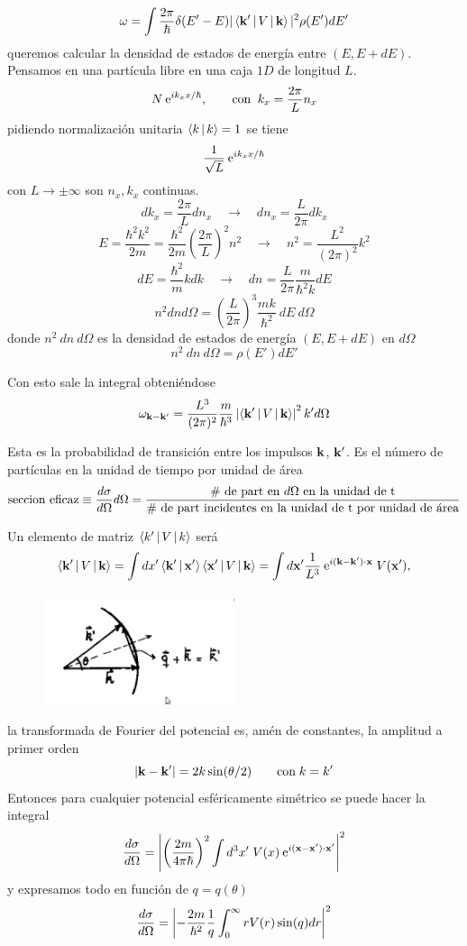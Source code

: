 \documentclass[10pt,oneside]{CBFT_book}
\begin{document}
\[
	\omega = \int \frac{2\pi}{\hbar}  \delta(E'-E) |\Braket{\vb{k}'|V|\vb{k}}|^2 \rho(E') dE'
\]
queremos calcular la densidad de estados de energía entre $(E,E+dE)$. Pensamos en una partícula libre en una 
caja $1D$ de longitud $L$.
\[
	N \:\mathrm{e}^{i k_x x /\hbar}, \qquad \text{con} \;\; k_x = \frac{2\pi}{L}n_x
\]
pidiendo normalización unitaria $\Braket{k|k}=1$ se tiene 
\[
	\frac{1}{\sqrt{L}} \:\mathrm{e}^{i k_x x /\hbar}
\]
con $L\to\pm\infty$ son $n_x,k_x$ continuas.
\[
	dk_x = \frac{2\pi}{L} dn_x \quad \longrightarrow \quad  dn_x = \frac{L}{2\pi} dk_x 
\]
\[
	E = \frac{\hbar^2k^2}{2m} = \frac{\hbar^2}{2m} \left( \frac{2\pi}{L}\right)^2 n^2 \quad 
	\longrightarrow \quad n^2 = \frac{L^2}{(2\pi)^2}k^2
\]
\[
	dE = \frac{\hbar^2}{m} k dk \quad \longrightarrow \quad dn = \frac{L}{2\pi}\frac{m}{\hbar^2 k} dE
\]
\[
	n^2 dn d\Omega = \left( \frac{L}{2\pi} \right)^3 \frac{mk}{\hbar^2} \:dE \:d\Omega
\]
donde $n^2\:dn\:d\Omega$ es la densidad de estados de energía $(E,E+dE)$ en $d\Omega$
\[
	n^2 \: dn \: d\Omega = \rho(E') dE'
\]

Con esto sale la integral obteniéndose
\[
	\omega_{\vb{k}-\vb{k}'} = 
	\frac{L^3}{(2\pi)^2} \frac{m}{\hbar^3} \left|\Braket{\vb{k}'|V|\vb{k}}\right|^2 k'd\Omega
\]

Esta es la probabilidad de transición entre los impulsos $\vb{k}$, $\vb{k}'$. Es el número de partículas en 
la unidad de tiempo por unidad de área 
\[
	\text{seccion eficaz} \equiv \frac{d^{\hspace{-0.05em}} {\sigma}}{d {\Omega}^{\hspace{-0.05em}}}d\Omega =
	\frac{\text{\# de part en $d\Omega$ en la unidad de t}}
	{\text{\# de part incidentes en la unidad de t por unidad de área}}
\]

Un elemento de matriz $\Braket{k'|V|k}$ será 
\[
	\Braket{\vb{k}'|V|\vb{k}} = \int dx'\Braket{\vb{k}'|\vb{x}'} \Braket{\vb{x}'|V|\vb{k}} =
	\int d\vb{x}' \frac{1}{L^3} \euler^{i (\vb{k}-\vb{k}')\cdot \vb{x}} \; V(\vb{x}'),
\]
\begin{figure}[htb]
	\begin{center}
	\includegraphics[width=0.5\textwidth]{images/teo2_31.pdf}
	\end{center}
	\caption{}
\end{figure} 
la transformada de Fourier del potencial es, amén de constantes, la amplitud a primer orden 
\[
	|\vb{k} - \vb{k}'| = 2k\sin(\theta/2) \qquad \text{con} \; k=k' 
\]
Entonces para cualquier potencial esféricamente simétrico se puede hacer la integral 
\[
	\dtot{\sigma}{\Omega} =
	\left|\left( \frac{2m}{4\pi\hbar}\right)^2 \int d^3x'\;V(x)\euler^{i(\vb{x}-\vb{x}')\cdot\vb{x}'}\right|^2
\]
y expresamos todo en función de $q=q(\theta)$
\[
	\frac{d^{\hspace{-0.05em}} {\sigma}}{d {\Omega}^{\hspace{-0.05em}}} =
	\left| -\frac{2m}{\hbar^2} \frac{1}{q} \int_0^\infty rV(r)\sin(q) dr \right|^2
\]
\end{document}

